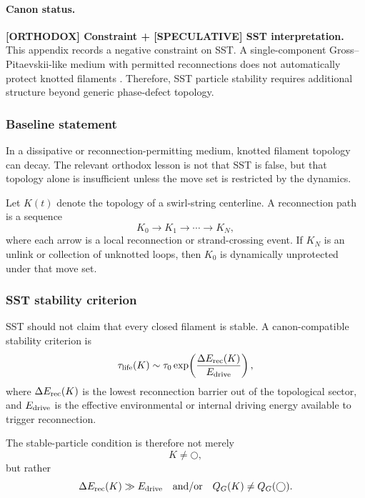 \paragraph{Canon status.}
\textbf{[ORTHODOX] Constraint + [SPECULATIVE] SST interpretation.}
This appendix records a negative constraint on SST. A single-component Gross--Pitaevskii-like medium with permitted reconnections does not automatically protect knotted filaments \cite{Kleckner2016SuperfluidKnotsUntie}. Therefore, SST particle stability requires additional structure beyond generic phase-defect topology.

\subsubsection{Baseline statement}
In a dissipative or reconnection-permitting medium, knotted filament topology can decay. The relevant orthodox lesson is not that SST is false, but that topology alone is insufficient unless the move set is restricted by the dynamics.

Let $K(t)$ denote the topology of a swirl-string centerline. A reconnection path is a sequence
\begin{equation}
    K_0 \longrightarrow K_1 \longrightarrow \cdots \longrightarrow K_N,
    \label{eq:reconnection_path}
\end{equation}
where each arrow is a local reconnection or strand-crossing event. If $K_N$ is an unlink or collection of unknotted loops, then $K_0$ is dynamically unprotected under that move set.

\subsubsection{SST stability criterion}
SST should not claim that every closed filament is stable. A canon-compatible stability criterion is
\begin{equation}
    \tau_{\rm life}(K)
    \sim \tau_0\exp\!\left(\frac{\Delta E_{\rm rec}(K)}{E_{\rm drive}}\right),
    \label{eq:sst_lifetime_barrier}
\end{equation}
where $\Delta E_{\rm rec}(K)$ is the lowest reconnection barrier out of the topological sector, and $E_{\rm drive}$ is the effective environmental or internal driving energy available to trigger reconnection.

The stable-particle condition is therefore not merely
\begin{equation}
    K\neq \bigcirc,
\end{equation}
but rather
\begin{equation}
    \Delta E_{\rm rec}(K)\gg E_{\rm drive}
    \quad\text{and/or}\quad
    Q_G(K)\neq Q_G(\bigcirc).
    \label{eq:sst_stability_condition}
\end{equation}

